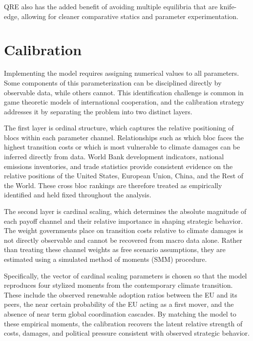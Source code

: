 \documentclass[12pt,a4paper]{article}
\begin{document}
QRE also has the added benefit of avoiding multiple equilibria that are knife-edge, allowing for cleaner comparative statics and parameter experimentation.

\section{Calibration}

Implementing the model requires assigning numerical values to all parameters. Some components of this parameterization can be disciplined directly by observable data, while others cannot. This identification challenge is common in game theoretic models of international cooperation, and the calibration strategy addresses it by separating the problem into two distinct layers.

The first layer is ordinal structure, which captures the relative positioning of blocs within each parameter channel. Relationships such as which bloc faces the highest transition costs or which is most vulnerable to climate damages can be inferred directly from data. World Bank development indicators, national emissions inventories, and trade statistics provide consistent evidence on the relative positions of the United States, European Union, China, and the Rest of the World. These cross bloc rankings are therefore treated as empirically identified and held fixed throughout the analysis.

The second layer is cardinal scaling, which determines the absolute magnitude of each payoff channel and their relative importance in shaping strategic behavior. The weight governments place on transition costs relative to climate damages is not directly observable and cannot be recovered from macro data alone. Rather than treating these channel weights as free scenario assumptions, they are estimated using a simulated method of moments (SMM) procedure.

Specifically, the vector of cardinal scaling parameters is chosen so that the model reproduces four stylized moments from the contemporary climate transition. These include the observed renewable adoption ratios between the EU and its peers, the near certain probability of the EU acting as a first mover, and the absence of near term global coordination cascades. By matching the model to these empirical moments, the calibration recovers the latent relative strength of costs, damages, and political pressure consistent with observed strategic behavior.
\end{document}
